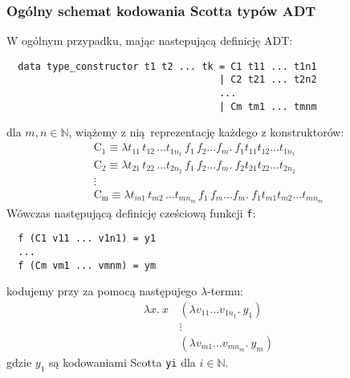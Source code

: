 \subsubsection{Ogólny schemat kodowania Scotta typów ADT}
W ogólnym przypadku, mając nastepującą definicję ADT:
\begin{verbatim}
  data type_constructor t1 t2 ... tk = C1 t11 ... t1n1
                                     | C2 t21 ... t2n2
                                     ...
                                     | Cm tm1 ... tmnm
\end{verbatim}
dla \(m, n \in \mathbb{N}\), wiążemy z nią reprezentację każdego z konstruktorów:
\begin{gather*}
  \mathrm{C_1} \equiv \lambda t_{11}\, t_{12}\, \dots t_{1n_1}\, f_1\, f_2 \dots f_m.\ f_1 t_{11} t_{12} \dots t_{1n_1}\\
  \mathrm{C_2} \equiv \lambda t_{21}\, t_{22}\, \dots t_{2n_2}\, f_1\, f_2 \dots f_m.\ f_2 t_{21} t_{22} \dots t_{2n_2}\\
 \vdots\\
  \mathrm{C_m} \equiv \lambda t_{m1}\, t_{m2}\, \dots t_{mn_m}\, f_1\, f_m \dots f_m.\ f_1 t_{m1} t_{m2} \dots t_{mn_m}
\end{gather*}
Wówczas następującą definicję cześciową funkcji \texttt{f}:
\begin{verbatim}
  f (C1 v11 ... v1n1) = y1
  ...
  f (Cm vm1 ... vmnm) = ym
\end{verbatim}
kodujemy przy za pomocą następujego \(\lambda\)-termu:
\begin{align*}
  \lambda x.\ x\,&(\lambda v_{11}\dots v_{1n_1}.\ y_1)\\
                 &\vdots\\
                 &(\lambda v_{m1}\dots v_{mn_m}.\ y_m)
\end{align*}
gdzie \(y_1\) są kodowaniami Scotta \texttt{yi} dla \(i\in\mathbb{N}\). 

